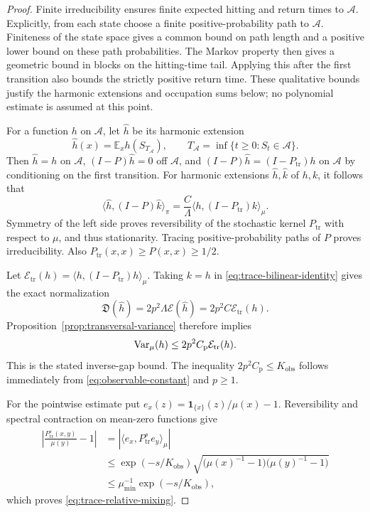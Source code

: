 \begin{proof}
Finite irreducibility ensures finite expected hitting and return
times to $\mathcal A$. Explicitly, from each state choose a finite
positive-probability path to $\mathcal A$. Finiteness of the state
space gives a common bound on path length and a positive lower
bound on these path probabilities. The Markov property then gives
a geometric bound in blocks on the hitting-time tail. Applying this
after the first transition also bounds the strictly positive return
time. These qualitative bounds justify the harmonic extensions and
occupation sums below; no polynomial estimate is assumed at this
point.

For a function $h$ on $\mathcal A$, let $\widehat h$ be its harmonic
extension
\[
 \widehat h(x)=\mathbb E_x h(S_{T_{\mathcal A}}),
 \qquad T_{\mathcal A}=\inf\{t\geq0:S_t\in\mathcal A\}.
\]
Then $\widehat h=h$ on $\mathcal A$, $(I-P)\widehat h=0$ off
$\mathcal A$, and $(I-P)\widehat h=(I-P_{\mathrm{tr}})h$ on
$\mathcal A$ by conditioning on the first transition. For harmonic
extensions $\widehat h,\widehat k$ of $h,k$, it follows that
\begin{equation}
 \langle \widehat h,(I-P)\widehat k\rangle_\pi
   =\frac{C}{\Lambda}
        \langle h,(I-P_{\mathrm{tr}})k\rangle_\mu.
 \label{eq:trace-bilinear-identity}
\end{equation}
Symmetry of the left side proves reversibility of the stochastic
kernel $P_{\mathrm{tr}}$ with respect to $\mu$, and thus stationarity.
Tracing positive-probability paths of $P$ proves irreducibility.
Also $P_{\mathrm{tr}}(x,x)\geq P(x,x)\geq1/2$.

Let
$\mathcal E_{\mathrm{tr}}(h)
 =\langle h,(I-P_{\mathrm{tr}})h\rangle_\mu$.
Taking $k=h$ in \eqref{eq:trace-bilinear-identity} gives the exact
normalization
\[
  \mathfrak D(\widehat h)
    =2p^2\Lambda\mathcal E(\widehat h)
    =2p^2C\mathcal E_{\mathrm{tr}}(h).
\]
Proposition~\ref{prop:transversal-variance} therefore implies
\[
  \operatorname{Var}_\mu(h)\leq2p^2C_{\mathrm p}\mathcal E_{\mathrm{tr}}(h).
\]
This is the stated inverse-gap bound. The inequality
$2p^2C_{\mathrm p}\leq K_{\mathrm{obs}}$ follows immediately from
\eqref{eq:observable-constant} and $p\geq1$.

For the pointwise estimate put
$e_x(z)=\mathbf 1_{\{x\}}(z)/\mu(x)-1$.
Reversibility and spectral contraction on mean-zero functions give
\begin{align*}
 \left|\frac{P_{\mathrm{tr}}^s(x,y)}{\mu(y)}-1\right|
  &=|\langle e_x,P_{\mathrm{tr}}^s e_y\rangle_\mu|\\
  &\leq\exp(-s/K_{\mathrm{obs}})
        \sqrt{\bigl(\mu(x)^{-1}-1\bigr)
                    \bigl(\mu(y)^{-1}-1\bigr)}\\
  &\leq\mu_{\min}^{-1}\exp(-s/K_{\mathrm{obs}}),
\end{align*}
which proves \eqref{eq:trace-relative-mixing}.


\end{proof}
